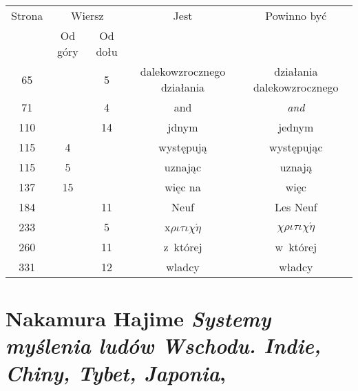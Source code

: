 \documentclass[a4paper,11pt]{article}
\numberwithin{equation}{section}
\begin{document}
\begin{center}

  \begin{tabular}{|c|c|c|c|c|}
    \hline
    Strona & \multicolumn{2}{c|}{Wiersz} & Jest
                              & Powinno być \\ \cline{2-3}
    & Od góry & Od dołu & & \\
    \hline
    65  & &  5 & dalekowzrocznego działania & działania dalekowzrocznego \\
    71  & &  4 & and & \textit{and} \\
    110 & & 14 & jdnym & jednym \\
    115 &  4 & & występują & występując \\
    115 &  5 & & uznając & uznają \\
    137 & 15 & & więc na & więc \\
    184 & & 11 & Neuf & Les Neuf \\
    233 & &  5 & x$\rho\iota\tau\iota\chi\acute{\eta}$ & $\chi\rho\iota\tau\iota\chi\acute{\eta}$ \\
    260 & & 11 & z~której & w~której \\
    331 & & 12 & wladcy & władcy \\
    \hline
  \end{tabular}

\end{center}

\VerSpaceTwo













\newpage

\section{Nakamura Hajime \textit{Systemy myślenia ludów
    Wschodu. Indie, Chiny, Tybet, Japonia},
  \parencite{NakamuraSystemyMysleniaLudowWschodu2005}}


\vspace{0em}



\vspace{0em}
\end{document}

